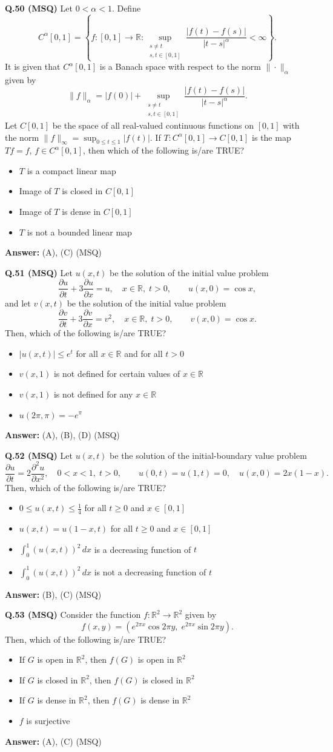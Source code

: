 \documentclass[11pt,a4paper]{article}
\newcommand{\optslistA}[4]{%
  \begin{itemize}
    \setlength{\itemsep}{2pt}\setlength{\parskip}{0pt}
    \item[(A)] #1
    \item[(B)] #2
    \item[(C)] #3
    \item[(D)] #4
  \end{itemize}%
}
\newcommand{\ans}[1]{\textbf{Answer:} #1\par\medskip}
\begin{document}
\textbf{Q.50 (MSQ)} Let $0 < \alpha < 1$. Define
\[
  C^\alpha[0, 1] = \left\{f : [0, 1] \to \mathbb{R} : \sup_{\substack{s \ne t \\ s, t \in [0, 1]}} \frac{|f(t) - f(s)|}{|t - s|^\alpha} < \infty\right\}.
\]
It is given that $C^\alpha[0, 1]$ is a Banach space with respect to the norm $\|\cdot\|_\alpha$ given by
\[
  \|f\|_\alpha = |f(0)| + \sup_{\substack{s \ne t \\ s, t \in [0, 1]}} \frac{|f(t) - f(s)|}{|t - s|^\alpha}.
\]
Let $C[0, 1]$ be the space of all real-valued continuous functions on $[0, 1]$ with the norm $\|f\|_\infty = \sup_{0 \le t \le 1} |f(t)|$. If $T : C^\alpha[0, 1] \to C[0, 1]$ is the map $Tf = f$, $f \in C^\alpha[0, 1]$, then which of the following is/are TRUE?
\optslistA{$T$ is a compact linear map}{Image of $T$ is closed in $C[0, 1]$}{Image of $T$ is dense in $C[0, 1]$}{$T$ is not a bounded linear map}
\ans{(A), (C) (MSQ)}

\textbf{Q.51 (MSQ)} Let $u(x, t)$ be the solution of the initial value problem
\[
  \frac{\partial u}{\partial t} + 3\frac{\partial u}{\partial x} = u, \quad x \in \mathbb{R}, \; t > 0, \qquad u(x, 0) = \cos x,
\]
and let $v(x, t)$ be the solution of the initial value problem
\[
  \frac{\partial v}{\partial t} + 3\frac{\partial v}{\partial x} = v^2, \quad x \in \mathbb{R}, \; t > 0, \qquad v(x, 0) = \cos x.
\]
Then, which of the following is/are TRUE?
\optslistA{$|u(x, t)| \le e^t$ for all $x \in \mathbb{R}$ and for all $t > 0$}{$v(x, 1)$ is not defined for certain values of $x \in \mathbb{R}$}{$v(x, 1)$ is not defined for any $x \in \mathbb{R}$}{$u(2\pi, \pi) = -e^\pi$}
\ans{(A), (B), (D) (MSQ)}

\textbf{Q.52 (MSQ)} Let $u(x, t)$ be the solution of the initial-boundary value problem
\[
  \frac{\partial u}{\partial t} = 2\frac{\partial^2 u}{\partial x^2}, \quad 0 < x < 1, \; t > 0, \qquad u(0, t) = u(1, t) = 0, \quad u(x, 0) = 2x(1 - x).
\]
Then, which of the following is/are TRUE?
\optslistA{$0 \le u(x, t) \le \frac{1}{4}$ for all $t \ge 0$ and $x \in [0, 1]$}{$u(x, t) = u(1 - x, t)$ for all $t \ge 0$ and $x \in [0, 1]$}{$\int_0^1 (u(x, t))^2\,dx$ is a decreasing function of $t$}{$\int_0^1 (u(x, t))^2\,dx$ is not a decreasing function of $t$}
\ans{(B), (C) (MSQ)}

\textbf{Q.53 (MSQ)} Consider the function $f : \mathbb{R}^2 \to \mathbb{R}^2$ given by
\[
  f(x, y) = (e^{2\pi x} \cos 2\pi y, \; e^{2\pi x} \sin 2\pi y).
\]
Then, which of the following is/are TRUE?
\optslistA{If $G$ is open in $\mathbb{R}^2$, then $f(G)$ is open in $\mathbb{R}^2$}{If $G$ is closed in $\mathbb{R}^2$, then $f(G)$ is closed in $\mathbb{R}^2$}{If $G$ is dense in $\mathbb{R}^2$, then $f(G)$ is dense in $\mathbb{R}^2$}{$f$ is surjective}
\ans{(A), (C) (MSQ)}
\end{document}
